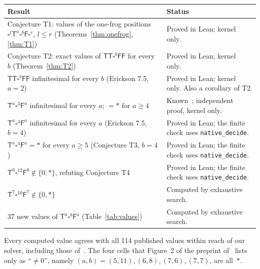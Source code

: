 \documentclass[11pt,a4paper]{article}
\newcommand{\Tt}{\mathsf{T}}
\newcommand{\Ff}{\mathsf{F}}
\newcommand{\E}{\square}
\newcommand{\lean}[1]{\texttt{#1}}
\theoremstyle{plain}
\theoremstyle{remark}
\begin{document}
\begin{center}
\renewcommand{\arraystretch}{1.25}
\begin{tabularx}{\linewidth}{@{}>{\raggedright}p{5.9cm}X@{}}
\toprule
Result & Status \\
\midrule
Conjecture T1: values of the one-frog positions $\E^l\Tt^a\E^b\Ff\E^r$, $l\le r$
  (Theorems~\ref{thm:onefrog}, \ref{thm:T1})
  & Proved in Lean; kernel only. \\
Conjecture T2: exact values of $\Tt\Tt\E^b\Ff\Ff$ for every $b$ (Theorem~\ref{thm:T2})
  & Proved in Lean; kernel only. \\
$\Tt\Tt\E^b\Ff\Ff$ infinitesimal for every $b$ (Erickson 7.5, $a=2$)
  & Proved in Lean; kernel only. Also a corollary of T2. \\
$\Tt^a\E^3\Ff^a$ infinitesimal for every $a$; $=\ast$ for $a\ge 4$
  & Known~\cite[Thm.~5.6.1]{Th08}; independent proof, kernel only. \\
$\Tt^a\E^4\Ff^a$ infinitesimal for every $a$ (Erickson 7.5, $b=4$)
  & Proved in Lean; the finite check uses \lean{native\_decide}. \\
$\Tt^a\E^4\Ff^a=\ast$ for every $a\ge5$ (Conjecture T3, $b=4$)
  & Proved in Lean; the finite check uses \lean{native\_decide}. \\
$\Tt^6\E^{12}\Ff^6\notin\{0,\ast\}$, refuting Conjecture T4
  & Proved in Lean; the finite check uses \lean{native\_decide}. \\
$\Tt^7\E^{10}\Ff^7\notin\{0,\ast\}$
  & Computed by exhaustive search. \\
37 new values of $\Tt^a\E^b\Ff^a$ (Table~\ref{tab:values})
  & Computed by exhaustive search. \\
\bottomrule
\end{tabularx}
\end{center}

\noindent
Every computed value agrees with all 114 published values within reach of our solver, including
those of~\cite{T11}. The four cells that Figure~2 of the preprint of~\cite{T11} lists only as
``$\neq 0$'', namely $(a,b)=(5,11),(6,8),(7,6),(7,7)$, are all~$\ast$.
\end{document}
